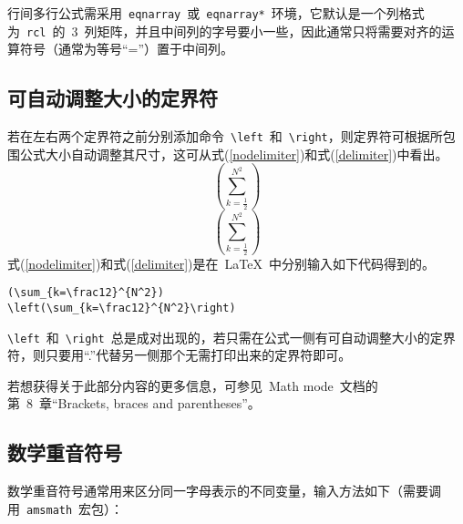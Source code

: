 行间多行公式需采用~\verb|eqnarray|~或~\verb|eqnarray*|~环境，它默认是一个列格式为~\verb|rcl|~的~3~列矩阵，并且中间列的字号要小一些，因此通常只将需要对齐的运算符号（通常为等号“=”）置于中间列。

\subsection{可自动调整大小的定界符}
若在左右两个定界符之前分别添加命令~\verb|\left|~和~\verb|\right|，则定界符可根据所包围公式大小自动调整其尺寸，这可从式(\ref{nodelimiter})和式(\ref{delimiter})中看出。
\begin{equation}\label{nodelimiter}
(\sum_{k=\frac12}^{N^2})
\end{equation}
\begin{equation}\label{delimiter}
\left(\sum_{k=\frac12}^{N^2}\right)
\end{equation}
式(\ref{nodelimiter})和式(\ref{delimiter})是在~\LaTeX~中分别输入如下代码得到的。
\begin{verbatim}
(\sum_{k=\frac12}^{N^2})
\left(\sum_{k=\frac12}^{N^2}\right)
\end{verbatim}
\verb|\left|~和~\verb|\right|~总是成对出现的，若只需在公式一侧有可自动调整大小的定界符，则只要用“.”代替另一侧那个无需打印出来的定界符即可。

若想获得关于此部分内容的更多信息，可参见~Math mode~文档的第~8~章“Brackets, braces and parentheses”。

\subsection{数学重音符号}
数学重音符号通常用来区分同一字母表示的不同变量，输入方法如下（需要调用~\verb|amsmath|~宏包）：

